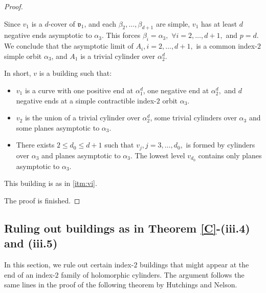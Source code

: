 \documentclass{amsart}
\begin{document}
\begin{proof}
\begin{itemize}
Since $v_1$ is a $d$-cover of $\mathfrak{v}_1$, and each $\beta_2,\ldots,\beta_{d+1}$ are simple, $v_1$ has at least $d$ negative ends asymptotic to $\alpha_3$. This forces $\beta_i=\alpha_3, \,\, \forall i=2,\ldots,d+1,$ 
and $p=d$.
We conclude that the asymptotic limit of $A_i,i=2,\ldots,d+1,$ is a common index-$2$ simple orbit $\alpha_3$, and $A_1$ is a trivial cylinder over $\alpha_2^d$.

In short, $v$ is a building such that:
\begin{itemize}
     
     \item $v_1$ is a curve with one positive end at $\alpha_1^d$, one negative end at  $\alpha_2^d,$ and $d$ negative ends at a simple contractible index-$2$ orbit $\alpha_3$.
     
     \item $v_2$ is the union of a trivial cylinder over $\alpha_2^d$, some trivial cylinders over $\alpha_3$ and some  planes asymptotic to $\alpha_3$.
     
     \item There exists $2\leq d_0\leq d+1$ such that $v_j,j=3,\ldots,d_0,$ is formed by cylinders over $\alpha_3$ and planes asymptotic to $\alpha_3$. The lowest level $v_{d_0}$ contains only planes asymptotic to $\alpha_3$.  
\end{itemize}
This building is as in \ref{itm:vi}.
\end{itemize}
The proof is finished. \end{proof}

\subsection{Ruling out buildings as in Theorem \ref{C}-(iii.4) and (iii.5)}\label{sec_ruling_out_buildings}

In this section, we  rule out certain index-$2$ buildings that might appear at the end of an index-$2$ family of holomorphic cylinders. The argument follows the same lines in the proof of the following theorem by Hutchings and Nelson.
\end{document}
